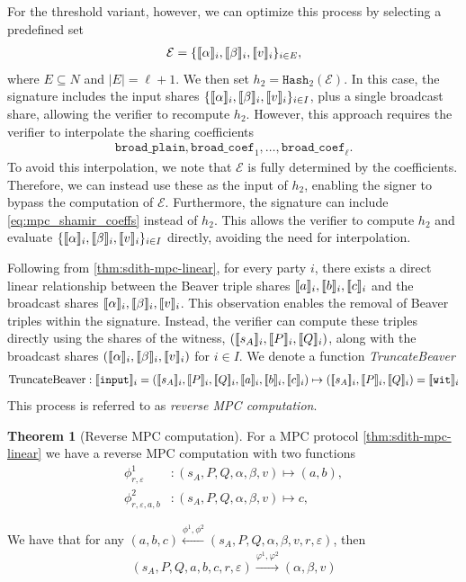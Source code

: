 \documentclass[11pt]{report}
\theoremstyle{definition}
\newtheorem{theorem}{Theorem}[section]
\theoremstyle{plain}
\begin{document}
\noindent
For the threshold variant, however, we can optimize this process by selecting a predefined set
\begin{align*}
  \mathcal{E} = \{\llbracket \alpha \rrbracket_i, \llbracket \beta \rrbracket_i, \llbracket v \rrbracket_i\}_{i \in E},
\end{align*}
where $E \subseteq N$ and $|E| = \ell + 1$. We then set $h_2 = \texttt{Hash}_2(\mathcal{E})$. In this case, the signature includes the input shares $\{\llbracket \alpha \rrbracket_i, \llbracket \beta \rrbracket_i, \llbracket v \rrbracket_i\}_{i \in I}$, plus a single broadcast share, allowing the verifier to recompute $h_2$. However, this approach requires the verifier to interpolate the sharing coefficients
\begin{align}
  \texttt{broad\_plain}, \texttt{broad\_coef}_1, \dots, \texttt{broad\_coef}_\ell.\label{eq:mpc_shamir_coeffs}
\end{align}
To avoid this interpolation, we note that $\mathcal{E}$ is fully determined by the coefficients. Therefore, we can instead use these as the input of $h_2$, enabling the signer to bypass the computation of $\mathcal{E}$. Furthermore, the signature can include \autoref{eq:mpc_shamir_coeffs} instead of $h_2$. This allows the verifier to compute $h_2$ and evaluate $\{\llbracket \alpha \rrbracket_i, \llbracket \beta \rrbracket_i, \llbracket v \rrbracket_i\}_{i \in I}$ directly, avoiding the need for interpolation.

Following from \autoref{thm:sdith-mpc-linear}, for every party $i$, there exists a direct linear relationship between the Beaver triple shares $\llbracket a \rrbracket_i, \llbracket b \rrbracket_i, \llbracket c \rrbracket_i$ and the broadcast shares $\llbracket \alpha \rrbracket_i, \llbracket \beta \rrbracket_i, \llbracket v \rrbracket_i$. This observation enables the removal of Beaver triples within the signature. Instead, the verifier can compute these triples directly using the shares of the witness, $(\llbracket s_A \rrbracket_i, \llbracket P \rrbracket_i, \llbracket Q \rrbracket_i)$, along with the broadcast shares $(\llbracket \alpha \rrbracket_i, \llbracket \beta \rrbracket_i, \llbracket v \rrbracket_i)$ for $i \in I$. We denote a function \textit{TruncateBeaver}
\begin{align}
  \text{TruncateBeaver} : \llbracket \texttt{input} \rrbracket_i = (\llbracket s_A \rrbracket_i, \llbracket P \rrbracket_i, \llbracket Q \rrbracket_i, \llbracket a \rrbracket_i, \llbracket b \rrbracket_i, \llbracket c \rrbracket_i) \mapsto (\llbracket s_A \rrbracket_i, \llbracket P \rrbracket_i, \llbracket Q \rrbracket_i) = \llbracket \texttt{wit} \rrbracket_i\label{eq:truncate_beaver}
\end{align}
This process is referred to as \textit{reverse MPC computation}.

\begin{theorem}[Reverse MPC computation]\label{thm:mpc_reverse}
  For a MPC protocol \autoref{thm:sdith-mpc-linear} we have a reverse MPC computation with two functions
  \begin{align}
    \phi^1_{r,\varepsilon}        & : (s_A, P, Q, \alpha, \beta, v) \mapsto (a, b), \\
    \phi^2_{r, \varepsilon, a, b} & : (s_A, P, Q, \alpha, \beta, v) \mapsto c,
  \end{align}

  We have that for any $(a,b,c) \stackrel{\phi^1, \phi^2}{\longleftarrow} (s_A, P, Q, \alpha, \beta, v, r, \varepsilon)$, then
  \begin{align*}
    (s_A, P, Q, a, b, c, r, \varepsilon) \stackrel{\varphi^1, \varphi^2}{\longrightarrow} (\alpha, \beta, v)
  \end{align*}
\end{theorem}
\end{document}
